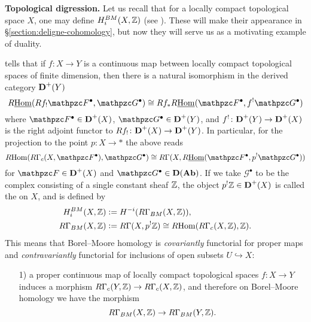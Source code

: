 \begin{nameless}\textbf{Topological digression.}
  Let us recall that for a locally compact topological space $X$, one may define
   $H^{BM}_i (X,\mathbb{Z})$
  (see \cite[Chapter~IX]{Iversen-1986}). These will make their appearance in
  \S\ref{section:deligne-cohomology}, but now they will serve us as a motivating
  example of duality.

   \cite[\S VII.5]{Iversen-1986} tells that if
  $f\colon X\to Y$ is a continuous map between locally compact topological
  spaces of finite dimension, then there is a natural isomorphism in the derived
  category $\text{\bf D}^+ (Y)$
  \[ \RiHom (Rf_! \mathcal{F}^\bullet, \mathcal{G}^\bullet) \isom
    Rf_* \RiHom (\mathcal{F}^\bullet, f^! \mathcal{G}^\bullet) \]
  where $\mathcal{F}^\bullet \in \categ{D}^+ (X)$,
  $\mathcal{G}^\bullet \in \categ{D}^+ (Y)$, and
  $f^!\colon \text{\bf D}^+ (Y) \to \text{\bf D}^+ (X)$ is the right adjoint functor
  to $Rf_!\colon \text{\bf D}^+ (X) \to \text{\bf D}^+ (Y)$. In particular, for the
  projection to the point $p\colon X\to \ast$ the above reads
  \[ \RHom (R\Gamma_c (X,\mathcal{F}^\bullet), \mathcal{G}^\bullet) \isom
    R\Gamma (X, \RiHom (\mathcal{F}^\bullet, p^! \mathcal{G}^\bullet)) \]
  for $\mathcal{F} \in \categ{D}^+ (X)$ and
  $\mathcal{G}^\bullet \in \categ{D} (\categ{Ab})$. If we take
  $\mathcal{G}^\bullet$ to be the complex consisting of a single constant sheaf
  $\mathbb{Z}$, the object $p^! \mathbb{Z} \in \text{\bf D}^+ (X)$ is called the
   on $X$, and  is defined by
  \begin{align*}
    H^{BM}_i (X,\mathbb{Z}) & \mathrel{\mathop:}= H^{-i} (R\Gamma_{BM} (X,\mathbb{Z})), \\
    R\Gamma_{BM} (X,\mathbb{Z}) & \mathrel{\mathop:}= R\Gamma (X, p^! \mathbb{Z})
                           \cong R\!\operatorname{Hom} (R\Gamma_c (X, \mathbb{Z}), \mathbb{Z}).
  \end{align*}
  This means that Borel--Moore homology is \emph{covariantly} functorial for
  proper maps and \emph{contravariantly} functorial for inclusions of open
  subsets $U \hookrightarrow X$:

  \begin{enumerate}
  \item[1)] a proper continuous map of locally compact topological spaces
    $f\colon X\to Y$ induces a morphism $R\Gamma_c (Y,\mathbb{Z}) \to R\Gamma_c (X,\mathbb{Z})$,
    and therefore on Borel--Moore homology we have the 
    morphism
    $$R\Gamma_{BM} (X, \mathbb{Z}) \to R\Gamma_{BM} (Y, \mathbb{Z}).$$


\end{enumerate}
\end{nameless}
